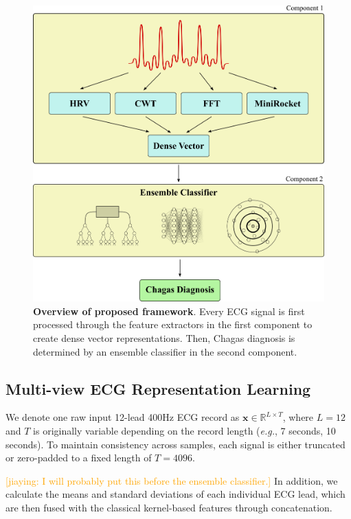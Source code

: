 \documentclass[twocolumn]{cinc}
\newcommand{\jiaying}[1]{\textcolor{orange}{[jiaying: #1]}}
\begin{document}
\begin{figure}[htbp!]
    \centering
    \includegraphics[width=1.0\linewidth]{model.png}
    \caption{\textbf{Overview of proposed framework}. Every ECG signal is first processed through the feature extractors in the first component to create dense vector representations. Then, Chagas diagnosis is determined by an ensemble classifier in the second component.}
    \label{model figure}
\end{figure}

\subsection{Multi-view ECG Representation Learning}
We denote one raw input 12-lead 400Hz ECG record as $\mathbf{x}\in \mathbb{R}^{L\times T}$, where $L=12$ and $T$ is originally variable depending on the record length (\textit{e.g.}, 7 seconds, 10 seconds). To maintain consistency across samples, each signal is either truncated or zero-padded to a fixed length of $T=4096$. 

\jiaying{I will probably put this before the ensemble classifier.} In addition, we calculate the means and standard deviations of each individual ECG lead, which are then fused with the classical kernel-based features through concatenation.
\end{document}
